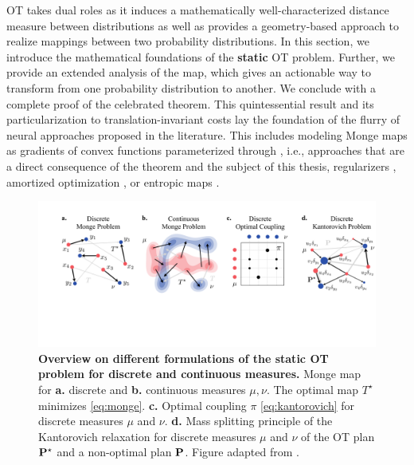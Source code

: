  \Acrlong{OT} takes dual roles as it induces a mathematically well-characterized distance measure between distributions as well as provides a geometry-based approach to realize mappings between two probability distributions.
In this section, we introduce the mathematical foundations of the \textbf{static} \acrshort{OT} problem. Further, we provide an extended analysis of the \citeauthor{monge1781histoire} map, which gives an actionable way to transform from one probability distribution to another.
We conclude with a complete proof of the celebrated \citeauthor{brenier1987decomposition} theorem. This quintessential result and its particularization to translation-invariant costs lay the foundation of the flurry of neural approaches proposed in the literature. This includes modeling Monge maps as gradients of convex functions parameterized through  \citep{amos2017input, huang2021convex, makkuva2020optimal, korotin2021neural, lubeck2022neural, bunne2022supervised}, i.e., approaches that are a direct consequence of the \citeauthor{brenier1987decomposition} theorem and the subject of this thesis, regularizers \citep{uscidda2023monge}, amortized optimization \citep{amos2023amortizing, amos2023meta}, or entropic maps \citep{pooladian2021entropic, pooladian2023minimax, divol2022optimal, cuturi2023monge}.

\begin{figure}[t]
  \includegraphics[width=\textwidth]{figures/fig_ot_background.pdf}
  \caption{\textbf{Overview on different formulations of the static \acrshort{OT} problem for discrete and continuous measures.} Monge map for \textbf{a.} discrete and \textbf{b.} continuous measures $\mu, \nu$. The optimal map $T^\star$ minimizes \eqref{eq:monge}. \textbf{c.} Optimal coupling $\pi$ \eqref{eq:kantorovich} for discrete measures $\mu$ and $\nu$. \textbf{d.} Mass splitting principle of the Kantorovich relaxation for discrete measures $\mu$ and $\nu$ of the \acrlong{OT} plan $\mathbf{P}^\star$ and a non-optimal plan $\mathbf{P}$. Figure adapted from \citet{peyre2019computational}.}	
  \label{fig:ot_principles}
\end{figure}

